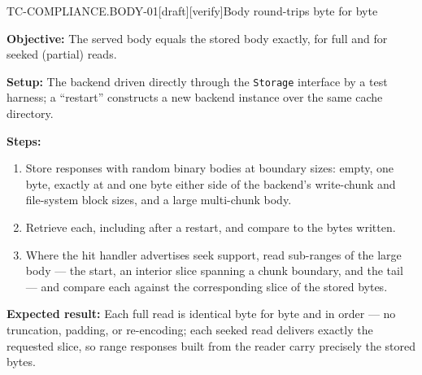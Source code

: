 \begin{requirement}{TC-COMPLIANCE.BODY-01}[draft][verify]{Body round-trips byte for byte}


  \textbf{Objective:} The served body equals the stored body exactly, for full
  and for seeked (partial) reads.

  \textbf{Setup:} The backend driven directly through the \texttt{Storage}
  interface by a test harness; a ``restart'' constructs a new backend instance
  over the same cache directory.

  \textbf{Steps:}
  \begin{enumerate}
    \item Store responses with random binary bodies at boundary sizes: empty,
      one byte, exactly at and one byte either side of the backend's
      write-chunk and file-system block sizes, and a large multi-chunk body.
    \item Retrieve each, including after a restart, and compare to the bytes
      written.
    \item Where the hit handler advertises seek support, read sub-ranges of the
      large body --- the start, an interior slice spanning a chunk boundary,
      and the tail --- and compare each against the corresponding slice of the
      stored bytes.
  \end{enumerate}

  \textbf{Expected result:} Each full read is identical byte for byte and in
  order --- no truncation, padding, or re-encoding; each seeked read delivers
  exactly the requested slice, so range responses built from the reader carry
  precisely the stored bytes.



\end{requirement}

